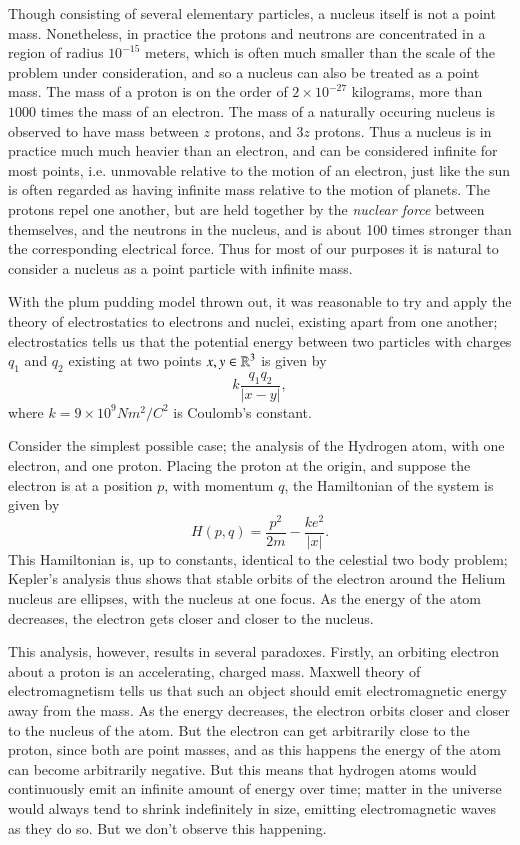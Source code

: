 Though consisting of several elementary particles, a nucleus itself is not a point mass. Nonetheless, in practice the protons and neutrons are concentrated in a region of radius $10^{-15}$ meters, which is often much smaller than the scale of the problem under consideration, and so a nucleus can also be treated as a point mass. The mass of a proton is on the order of $2 \times 10^{-27}$ kilograms, more than $1000$ times the mass of an electron. The mass of a naturally occuring nucleus is observed to have mass between $z$ protons, and $3z$ protons. Thus a nucleus is in practice much much heavier than an electron, and can be considered infinite for most points, i.e. unmovable relative to the motion of an electron, just like the sun is often regarded as having infinite mass relative to the motion of planets. The protons repel one another, but are held together by the \emph{nuclear force} between themselves, and the neutrons in the nucleus, and is about 100 times stronger than the corresponding electrical force. Thus for most of our purposes it is natural to consider a nucleus as a point particle with infinite mass.

With the plum pudding model thrown out, it was reasonable to try and apply the theory of electrostatics to electrons and nuclei, existing apart from one another; electrostatics tells us that the potential energy between two particles with charges $q_1$ and $q_2$ existing at two points $x,y \in \operatorname{\mathbb{R}}^3$ is given by
%
\[ k \frac{q_1 q_2}{|x - y|}, \]
%
where $k = 9 \times 10^9 N m^2 / C^2$ is Coulomb's constant.

Consider the simplest possible case; the analysis of the Hydrogen atom, with one electron, and one proton. Placing the proton at the origin, and suppose the electron is at a position $p$, with momentum $q$, the Hamiltonian of the system is given by
%
\[ H(p,q) = \frac{p^2}{2m} - \frac{ke^2}{|x|}. \]
%
This Hamiltonian is, up to constants, identical to the celestial two body problem; Kepler's analysis thus shows that stable orbits of the electron around the Helium nucleus are ellipses, with the nucleus at one focus. As the energy of the atom decreases, the electron gets closer and closer to the nucleus.

This analysis, however, results in several paradoxes. Firstly, an orbiting electron about a proton is an accelerating, charged mass. Maxwell theory of electromagnetism tells us that such an object should emit electromagnetic energy away from the mass. As the energy decreases, the electron orbits closer and closer to the nucleus of the atom. But the electron can get arbitrarily close to the proton, since both are point masses, and as this happens the energy of the atom can become arbitrarily negative. But this means that hydrogen atoms would continuously emit an infinite amount of energy over time; matter in the universe would always tend to shrink indefinitely in size, emitting electromagnetic waves as they do so. But we don't observe this happening.

